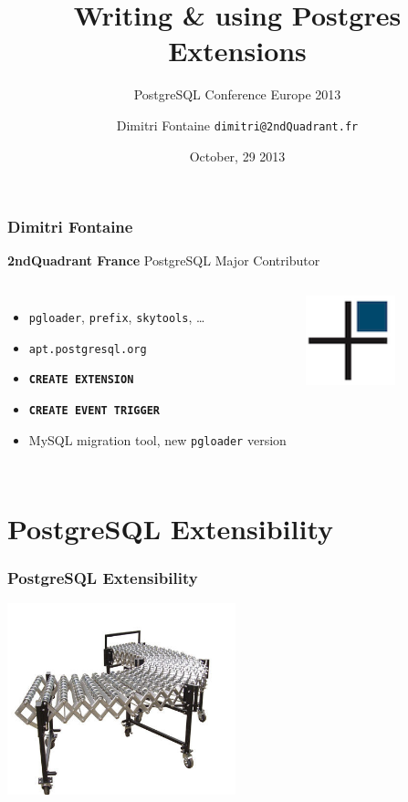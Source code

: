 \documentclass{beamer}
\title{Writing \& using Postgres Extensions}
\subtitle{PostgreSQL Conference Europe 2013}
\author{Dimitri Fontaine \texttt{dimitri@2ndQuadrant.fr}}
\date{October, 29 2013}
\begin{document}
\frame{\titlepage}

\begin{frame}[fragile]
  \frametitle{Dimitri Fontaine}

  \begin{center}
    \textbf{2ndQuadrant France}
    \linebreak
    PostgreSQL Major Contributor
  \end{center}
  \vfill

\begin{columns}[c]

  \begin{itemize}
   \item \texttt{pgloader}, \texttt{prefix}, \texttt{skytools}, …
   \item \texttt{apt.postgresql.org}
   \item \texttt{\textbf{CREATE EXTENSION}}
   \item \texttt{\textbf{CREATE EVENT TRIGGER}}
   \item MySQL migration tool, new \texttt{pgloader} version
  \end{itemize}  

\begin{center}
  \includegraphics[height=7em]{2ndQuadrant-cross.png}
\end{center}
\end{columns}
\end{frame}

\section{PostgreSQL Extensibility}

\begin{frame}[fragile]
  \frametitle{PostgreSQL Extensibility}

  \vfill

\begin{center}
  \includegraphics[height=15em]{extensible.jpg}
\end{center}
\end{frame}
\end{document}
